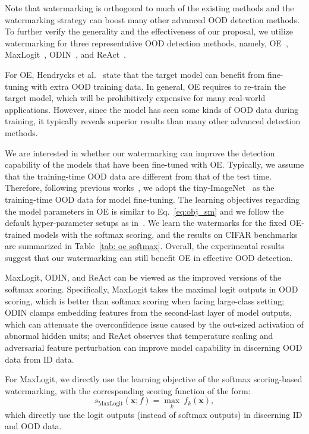 \documentclass{article}
\begin{document}
Note that watermarking is orthogonal to much of the existing methods and the watermarking strategy can boost many other advanced OOD detection methods. To further verify the generality and the effectiveness of our proposal, we utilize watermarking for three representative OOD detection methods, namely, OE~\cite{HendrycksMD19}, MaxLogit~\cite{hendrycks2021improving}, ODIN~\cite{LiangLS18}, and ReAct~\cite{sun2021react}. 

For OE, Hendrycks et al.~\cite{HendrycksMD19} state that the target model can benefit from fine-tuning with extra OOD training data. In general, OE requires to re-train the target model, which will be prohibitively expensive for many real-world applications. However, since the model has seen some kinds of OOD data during training, it typically reveals superior results than many other advanced detection methods. 


We are interested in whether our watermarking can improve the detection capability of the models that have been fine-tuned with OE. Typically, we assume that the training-time OOD data are different from that of the test time. Therefore, following previous works~\cite{HendrycksMD19,liu2020energy}, we adopt the tiny-ImageNet~\cite{le2015tiny} as the training-time OOD data for model fine-tuning. The learning objectives regarding the model parameters in OE is similar to Eq.~\eqref{eq:obj_sm} and we follow the default hyper-parameter setups as in~\cite{HendrycksMD19}. We learn the watermarks for the fixed OE-trained models with the softmax scoring, and the results on CIFAR benchmarks are summarized in Table~\ref{tab: oe softmax}. Overall, the experimental results suggest that our watermarking can still benefit OE in effective OOD detection. 


MaxLogit, ODIN, and ReAct can be viewed as the improved versions of the softmax scoring. Specifically, MaxLogit takes the maximal logit outputs in OOD scoring, which is better than softmax scoring when facing large-class setting; ODIN clamps embedding features from the second-last layer of model outputs, which can attenuate the overconfidence issue caused by the out-sized activation of abnormal hidden units; and ReAct observes that temperature scaling and adversarial feature perturbation can improve model capability in discerning OOD data from ID data. 

{For MaxLogit, we directly use the learning objective of the softmax scoring-based watermarking, with the corresponding scoring function of the form:}
\begin{equation}
    {s_\text{MaxLogit}(\boldsymbol{x};f) = \max_k~f_k(\boldsymbol{{x}}),}  \label{eq: maxlogit}
\end{equation}
{which directly use the logit outputs (instead of softmax outputs) in discerning ID and OOD data. }
\end{document}
